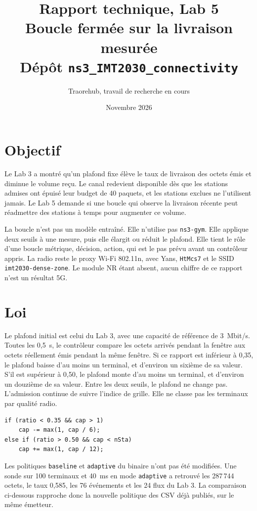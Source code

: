 \documentclass[11pt,a4paper]{article}
\title{Rapport technique, Lab 5\\
\large Boucle fermée sur la livraison mesurée\\
Dépôt \texttt{ns3\_IMT2030\_connectivity}}
\author{Traorehub, travail de recherche en cours}
\date{Novembre 2026}
\begin{document}
\maketitle
\tableofcontents
\newpage

\section{Objectif}

Le Lab 3 a montré qu'un plafond fixe élève le taux de livraison des octets émis et diminue le volume reçu. Le canal redevient disponible dès que les stations admises ont épuisé leur budget de 40 paquets, et les stations exclues ne l'utilisent jamais. Le Lab 5 demande si une boucle qui observe la livraison récente peut réadmettre des stations à temps pour augmenter ce volume.

La boucle n'est pas un modèle entraîné. Elle n'utilise pas \texttt{ns3-gym}. Elle applique deux seuils à une mesure, puis elle élargit ou réduit le plafond. Elle tient le rôle d'une boucle métrique, décision, action, qui est le pas prévu avant un contrôleur appris. La radio reste le proxy Wi-Fi 802.11n, avec Yans, \texttt{HtMcs7} et le SSID \texttt{imt2030-dense-zone}. Le module NR étant absent, aucun chiffre de ce rapport n'est un résultat 5G.

\section{Loi}

Le plafond initial est celui du Lab 3, avec une capacité de référence de 3~Mbit/s. Toutes les 0,5~s, le contrôleur compare les octets arrivés pendant la fenêtre aux octets réellement émis pendant la même fenêtre. Si ce rapport est inférieur à 0,35, le plafond baisse d'au moins un terminal, et d'environ un sixième de sa valeur. S'il est supérieur à 0,50, le plafond monte d'au moins un terminal, et d'environ un douzième de sa valeur. Entre les deux seuils, le plafond ne change pas. L'admission continue de suivre l'indice de grille. Elle ne classe pas les terminaux par qualité radio.

\begin{lstlisting}
if (ratio < 0.35 && cap > 1)
    cap -= max(1, cap / 6);
else if (ratio > 0.50 && cap < nSta)
    cap += max(1, cap / 12);
\end{lstlisting}

Les politiques \texttt{baseline} et \texttt{adaptive} du binaire n'ont pas été modifiées. Une sonde sur 100 terminaux et 40~ms en mode \texttt{adaptive} a retrouvé les 287\,744 octets, le taux 0,585, les 76 événements et les 24 flux du Lab 3. La comparaison ci-dessous rapproche donc la nouvelle politique des CSV déjà publiés, sur le même émetteur.
\end{document}
